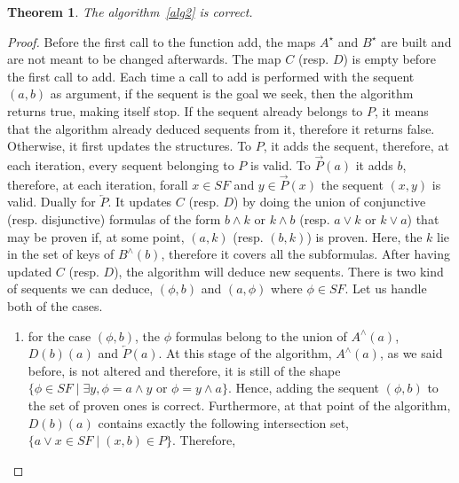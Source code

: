 \documentclass[a4paper, 11pt]{article}
\newtheorem{theorem}{Theorem}
\begin{document}
    \begin{theorem}
	    The algorithm~\ref{alg2} is correct.
    \end{theorem}
    \begin{proof}
	    Before the first call to the function \textsf{add}, the maps $A^\star$ and $B^\star$
	    are built and are not meant to be changed afterwards. The map $C$ (resp. $D$) is empty 
	    before the
	    first call to \textsf{add}. Each time a call to \textsf{add} is performed with the sequent 
	    $(a,b)$ as argument,
	    if the sequent is the goal we seek, then the algorithm returns true, making itself stop. 
	    If the sequent already belongs to $P$, it means that the algorithm already deduced sequents 
	    from it, therefore it returns false. Otherwise,
	    it first updates the structures. To $P$, it adds the sequent, therefore, at each iteration,
	    every sequent belonging to $P$ is valid. To $\overrightarrow{P}(a)$ it adds $b$, therefore,
	    at each iteration, forall $x\in SF$ and $y\in\overrightarrow{P}(x)$ the sequent $(x,y)$ is 
	    valid. Dually for $\overleftarrow{P}$. 
	    It updates $C$ (resp. $D$) by doing the union of conjunctive (resp. disjunctive) 
	    formulas of the form $b\wedge k$ or $k\wedge b$ (resp. $a\vee k$ or $k\vee a$) that may be 
	    proven if, at some point, $(a,k)$ (resp. $(b, k)$) is proven. Here, the $k$ lie in
	    the set of keys of $B^\wedge(b)$, therefore it covers all the subformulas.  
	    After having updated $C$ (resp. $D$),
	    the algorithm will deduce new sequents. 
	    There is two kind of sequents
	    we can deduce, $(\phi,b)$ and $(a,\phi)$ where $\phi\in SF$. Let us handle both of the cases.
	    \begin{enumerate}
		    \item
			    for the case $(\phi,b)$, the $\phi$ formulas belong to the union of 
			    $A^\wedge(a)$, $D(b)(a)$ and $\overleftarrow{P}(a)$. At this stage of the 
			    algorithm, $A^\wedge(a)$,
			    as we said before, is not altered and therefore, it is still of the shape
			    $\{\phi\in SF\mid\exists y,\phi=a\wedge y\text{ or }\phi=y\wedge a\}$. Hence,
			    adding the sequent $(\phi,b)$ to the set of proven ones is correct.
			    Furthermore, at that point of the algorithm, $D(b)(a)$ contains exactly the 
			    following intersection set, $\{a\vee x\in SF\mid(x,b)\in P\}$. Therefore,

\end{enumerate}
\end{proof}
\end{document}
